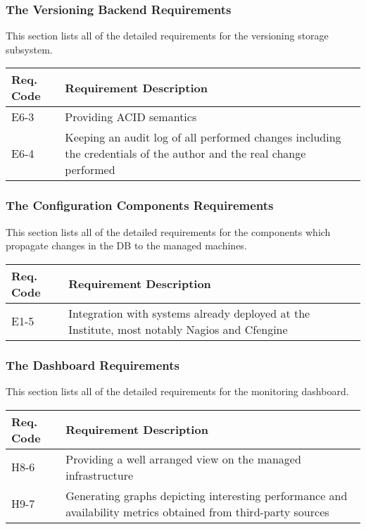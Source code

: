 \documentclass[12pt]{article}
\begin{document}
\subsubsection{The Versioning Backend Requirements}
This section lists all of the detailed requirements for the versioning storage subsystem.

\begin{center}
	\begin{tabular}{| p{2.5cm} | p{12.5cm} |}
	 	\hline
		\textbf{Req. Code} & \textbf{Requirement Description}\\
		\hline
        E6-3    & Providing ACID semantics\\
		\hline
        E6-4    & Keeping an audit log of all performed changes including the credentials
                  of the author and the real change performed\\
        \hline
	\end{tabular}
	\label{tab:VersioningBackendRequirements}
\end{center}

\subsubsection{The Configuration Components Requirements}
This section lists all of the detailed requirements for the components which propagate changes in the DB to the managed machines.

\begin{center}
	\begin{tabular}{| p{2.5cm} | p{12.5cm} |}
	 	\hline
		\textbf{Req. Code} & \textbf{Requirement Description}\\
		\hline
        E1-5    & Integration with systems already deployed at the Institute, most notably Nagios and Cfengine\\
        \hline
	\end{tabular}
	\label{tab:ConfigurationComponentsRequirements}
\end{center}


\subsubsection{The Dashboard Requirements}
This section lists all of the detailed requirements for the monitoring dashboard.

\begin{center}
	\begin{tabular}{| p{2.5cm} | p{12.5cm} |}
	 	\hline
		\textbf{Req. Code} & \textbf{Requirement Description}\\
		\hline
        H8-6    &   Providing a well arranged view on the managed infrastructure\\
		\hline
        H9-7    &   Generating graphs depicting interesting performance and availability
                    metrics obtained from third-party sources\\
        \hline
	\end{tabular}
	\label{tab:DashboardRequirements}
\end{center}
\end{document}

